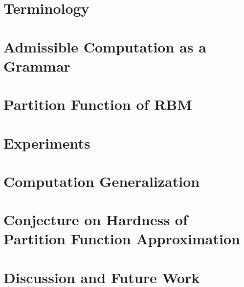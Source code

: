 \documentclass{article}
\begin{document}
\section{Terminology}


\section{Admissible Computation as a Grammar}\label{sec:grammars}



\section{Partition Function of RBM} \label{partitionfunction}


\section{Experiments}


\section{Computation Generalization}\label{agenda}


\section{Conjecture on Hardness of Partition Function Approximation}


\section{Discussion and Future Work}



\nocite{*}


\end{document}
